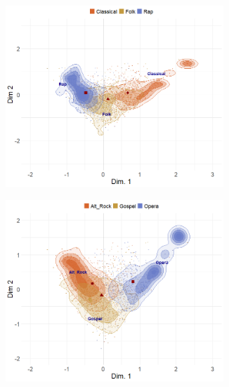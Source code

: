 \documentclass[12pt]{article}
\begin{document}
\begin{figure}[t]
    \captionsetup[subfigure]{font=footnotesize,labelfont=footnotesize}
    \centering
     \begin{subfigure}[b]{0.49\textwidth}
        \includegraphics[trim={0cm 0cm 0cm 0cm},clip, width=0.9\textwidth]{Plots/genre-proto-ex1.png}
            \caption{}
            \label{fig:genre-fuzz-a}
    \end{subfigure}
     \begin{subfigure}[b]{0.49\textwidth}
        \includegraphics[trim={0cm 0cm 0cm 0cm},clip, width=0.9\textwidth]{Plots/genre-proto-ex2.png}
            \caption{}
            \label{fig:genre-fuzz-b}
    \end{subfigure}

\end{figure}
\end{document}
